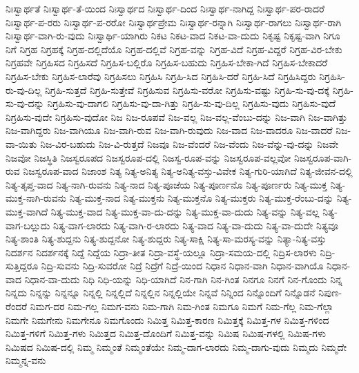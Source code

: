 {ನಿಃಸ್ವಾರ್ಥತೆ
ನಿಃಸ್ವಾರ್ಥ-ತೆ-ಯಿಂದ
ನಿಃಸ್ವಾರ್ಥದ
ನಿಃಸ್ವಾರ್ಥ-ದಿಂದ
ನಿಃಸ್ವಾರ್ಥ-ನಾಗಿದ್ದ
ನಿಃಸ್ವಾರ್ಥ-ಪರ-ರಾದರೆ
ನಿಃಸ್ವಾರ್ಥ-ಪ-ರರು
ನಿಃಸ್ವಾರ್ಥ-ಪ-ರರೋ
ನಿಃಸ್ವಾರ್ಥಪ್ರೇಮ
ನಿಃಸ್ವಾರ್ಥ-ರನ್ನಾಗಿ
ನಿಃಸ್ವಾರ್ಥ-ರಾಗಲು
ನಿಃಸ್ವಾರ್ಥ-ರಾಗಿ
ನಿಃಸ್ವಾರ್ಥ-ವಾಗಿ-ರು-ವುದು
ನಿಃಸ್ವಾರ್ಥಿ-ಯಾಗಿರು
ನಿಕಟ
ನಿಕಟ-ವಾದ
ನಿಕಟ-ವಾ-ದುದು
ನಿಕೃಷ್ಟ
ನಿಕೃಷ್ಟ-ವಾಗಿ
ನಿಗೂ
ನಿಗೆ
ನಿಗ್ರಹ
ನಿಗ್ರಹಕ್ಕೆ
ನಿಗ್ರಹ-ದಲ್ಲಿದೆಯೊ
ನಿಗ್ರಹ-ದಲ್ಲಿವೆ
ನಿಗ್ರಹ-ವನ್ನು
ನಿಗ್ರಹ-ವಿದೆ
ನಿಗ್ರಹ-ವಿದ್ದರೆ
ನಿಗ್ರಹ-ವಿರ-ಬೇಕು
ನಿಗ್ರಹವೇ
ನಿಗ್ರಹಿಸದ
ನಿಗ್ರಹಿಸದೆ
ನಿಗ್ರಹಿಸ-ಬಲ್ಲಿರೊ
ನಿಗ್ರಹಿಸ-ಬಹುದು
ನಿಗ್ರಹಿಸ-ಬೇಕಾ-ಗಿದೆ
ನಿಗ್ರಹಿಸ-ಬೇಕಾದರೆ
ನಿಗ್ರಹಿಸ-ಬೇಕು
ನಿಗ್ರಹಿಸ-ಲಾರೆವು
ನಿಗ್ರಹಿಸಲು
ನಿಗ್ರಹಿಸಿ
ನಿಗ್ರಹಿ-ಸಿದ
ನಿಗ್ರಹಿಸಿ-ದರೆ
ನಿಗ್ರಹಿ-ಸಿದೆ
ನಿಗ್ರಹಿಸಿದ್ದರು
ನಿಗ್ರಹಿಸಿ-ರು-ವು-ದಿಲ್ಲ
ನಿಗ್ರಹಿ-ಸುತ್ತದೆ
ನಿಗ್ರಹಿ-ಸುತ್ತೇವೆ
ನಿಗ್ರಹಿಸುವ
ನಿಗ್ರಹಿಸು-ವರೋ
ನಿಗ್ರಹಿಸು-ವಷ್ಟು
ನಿಗ್ರಹಿ-ಸು-ವು-ದಕ್ಕೆ
ನಿಗ್ರಹಿ-ಸು-ವು-ದನ್ನು
ನಿಗ್ರಹಿಸು-ವು-ದಾಗಲಿ
ನಿಗ್ರಹಿಸು-ವು-ದಾ-ಗಿತ್ತು
ನಿಗ್ರಹಿ-ಸು-ವು-ದಿಲ್ಲ
ನಿಗ್ರಹಿಸು-ವುದು
ನಿಗ್ರಹಿಸು-ವುದೆ
ನಿಗ್ರಹಿಸು-ವುದೇ
ನಿಗ್ರಹಿಸು-ವುದೋ
ನಿಜ
ನಿಜ-ರೂಪವೆ
ನಿಜ-ವಲ್ಲ
ನಿಜ-ವಲ್ಲ-ವೆಂಬು-ದನ್ನು
ನಿಜ-ವಾಗಿ
ನಿಜ-ವಾಗಿತ್ತು
ನಿಜ-ವಾಗಿದ್ದರು
ನಿಜ-ವಾಗಿಯೂ
ನಿಜ-ವಾಗಿ-ರುವ
ನಿಜ-ವಾಗಿ-ರುವುದು
ನಿಜ-ವಾದ
ನಿಜ-ವಾದರೂ
ನಿಜ-ವಾದರೆ
ನಿಜ-ವಾ-ಯಿತು
ನಿಜ-ವಿರ-ಬಹುದು
ನಿಜ-ವಿ-ರುತ್ತದೆ
ನಿಜವೂ
ನಿಜ-ವೆಂದರೆ
ನಿಜ-ವೆಂದು
ನಿಜ-ವೆನ್ನು-ವು-ದನ್ನು
ನಿಜವೇ
ನಿಜವೋ
ನಿಜಸ್ಥಿತಿ
ನಿಜಸ್ವರೂಪದ
ನಿಜಸ್ವರೂಪ-ದಲ್ಲಿ
ನಿಜಸ್ವ-ರೂಪ-ವನ್ನು
ನಿಜಸ್ವರೂಪ-ವಲ್ಲವೋ
ನಿಜಸ್ವರೂಪ-ವಾಗಿ-ರುವ
ನಿಜಸ್ವರೂಪ-ವಾದ
ನಿಜಾಂಶ
ನಿತ್ಯ
ನಿತ್ಯ-ಅನಿತ್ಯ
ನಿತ್ಯ-ಅನಿತ್ಯ-ವಸ್ತು-ವಿವೇಕ
ನಿತ್ಯ-ಗುರಿ-ಯಾಗಿದೆ
ನಿತ್ಯ-ಜೀವನ-ದಲ್ಲಿ
ನಿತ್ಯ-ತೃಪ್ತ-ವಾದ
ನಿತ್ಯ-ನಾಗಿ-ರುವನು
ನಿತ್ಯ-ನಾದ
ನಿತ್ಯ-ಪೂಜೆಯ
ನಿತ್ಯ-ಪೂರ್ಣನೊ
ನಿತ್ಯ-ಪೂರ್ಣರು
ನಿತ್ಯ-ಮುಕ್ತ
ನಿತ್ಯ-ಮುಕ್ತ-ನಾಗಿ-ರುವನು
ನಿತ್ಯ-ಮುಕ್ತ-ನಾದ
ನಿತ್ಯ-ಮುಕ್ತನು
ನಿತ್ಯ-ಮುಕ್ತನೊ
ನಿತ್ಯ-ಮುಕ್ತರು
ನಿತ್ಯ-ಮುಕ್ತ-ರೆಂಬು-ದನ್ನು
ನಿತ್ಯ-ಮುಕ್ತ-ವಾಗಿದೆ
ನಿತ್ಯ-ಮುಕ್ತ-ವಾದ
ನಿತ್ಯ-ಮುಕ್ತ-ವಾ-ದು-ದನ್ನು
ನಿತ್ಯ-ಮುಕ್ತ-ವಾ-ದುದು
ನಿತ್ಯ-ವನ್ನು
ನಿತ್ಯ-ವಲ್ಲ
ನಿತ್ಯ-ವಾಗ-ಬಲ್ಲುದು
ನಿತ್ಯ-ವಾಗ-ಲಾರದು
ನಿತ್ಯ-ವಾಗಿ-ರ-ಲಾರದು
ನಿತ್ಯ-ವಾದ
ನಿತ್ಯ-ವಾ-ದುದು
ನಿತ್ಯ-ವಾ-ದುದೇ
ನಿತ್ಯವೂ
ನಿತ್ಯ-ಶಾಂತಿ
ನಿತ್ಯ-ಶುದ್ದನು
ನಿತ್ಯ-ಶುದ್ದನೋ
ನಿತ್ಯ-ಶುದ್ದರು
ನಿತ್ಯ-ಸಾಕ್ಷಿ
ನಿತ್ಯ-ಸಾ-ಮರಸ್ಯ-ವನ್ನು
ನಿತ್ಯಾ-ನಿತ್ಯ-ವಸ್ತು
ನಿದರ್ಶನ
ನಿದರ್ಶನಕ್ಕೆ
ನಿದ್ದೆ
ನಿದ್ದೆಯ
ನಿದ್ರಾ-ತೀತ
ನಿದ್ರಾ-ವಸ್ಥೆ-ಯಲ್ಲೂ
ನಿದ್ರಾ-ಸಮಯ-ದಲ್ಲಿ
ನಿದ್ರಿಸ-ಲಾರಳು
ನಿದ್ರಿ-ಸುತ್ತಿದ್ದರೂ
ನಿದ್ರಿ-ಸುವನು
ನಿದ್ರಿ-ಸುವರೋ
ನಿದ್ರೆ
ನಿದ್ರೆಗೆ
ನಿದ್ರೆ-ಯಿಂದ
ನಿಧಾನ
ನಿಧಾನ-ವಾಗಿ
ನಿಧಾನ-ವಾಗಿಯೊ
ನಿಧಾನ-ವಾದ
ನಿಧಾನ-ವಾ-ದುದು
ನಿಧಿ
ನಿಧಿ-ಯನ್ನು
ನಿಧಿ-ಯಾಗಿದೆ
ನಿನ-ಗಾಗಿ
ನಿನ-ಗಿಂತ
ನಿನಗೂ
ನಿನಗೆ
ನಿನ-ಗೊಂದು
ನಿನ್ನ
ನಿನ್ನದು
ನಿನ್ನನ್ನು
ನಿನ್ನನ್ನೂ
ನಿನ್ನಲ್ಲಿ
ನಿನ್ನಲ್ಲಿದೆ
ನಿನ್ನಲ್ಲಿನ
ನಿನ್ನಲ್ಲಿಯೇ
ನಿನ್ನವೆ
ನಿನ್ನಿಂದ
ನಿನ್ನೊಂದಿಗೆ
ನಿನ್ನೊಡನೆ
ನಿಪುಣ-ರೆಂದರೆ
ನಿಮಗ-ದರ
ನಿಮ-ಗಲ್ಲ
ನಿಮಗ-ವನು
ನಿಮ-ಗಾಗಿ
ನಿಮ-ಗಿಂತ
ನಿಮಗೂ
ನಿಮಗೆ
ನಿಮ-ಗೆಲ್ಲ
ನಿಮ-ಗೆಲ್ಲಾ
ನಿಮಗೇ
ನಿಮಗೇನು
ನಿಮಗೇನೂ
ನಿಮಗೊಂದು
ನಿಮಿತ್ತ
ನಿಮಿತ್ತ-ಕಾರಣ
ನಿಮಿತ್ತಕ್ಕೆ
ನಿಮಿತ್ತ-ಗಳ
ನಿಮಿತ್ತ-ಗಳಿಂದ
ನಿಮಿತ್ತ-ಗಳಿಗೆ
ನಿಮಿತ್ತ-ಗಳು
ನಿಮಿತ್ತದ
ನಿಮಿತ್ತ-ದೊಂದಿಗೆ
ನಿಮಿತ್ತ-ವನ್ನು
ನಿಮಿಷ
ನಿಮಿಷ-ಗಳಲ್ಲಿ
ನಿಮಿಷ-ಗಳು
ನಿಮಿಷದ
ನಿಮಿಷ-ದಲ್ಲಿ
ನಿಮ್ಮ
ನಿಮ್ಮಂತೆ
ನಿಮ್ಮಂತೆಯೇ
ನಿಮ್ಮ-ದಾಗ-ಲಾರದು
ನಿಮ್ಮ-ದಾಗು-ವುದು
ನಿಮ್ಮದು
ನಿಮ್ಮದೇ
ನಿಮ್ಮನ್ನ-ವನು
}
